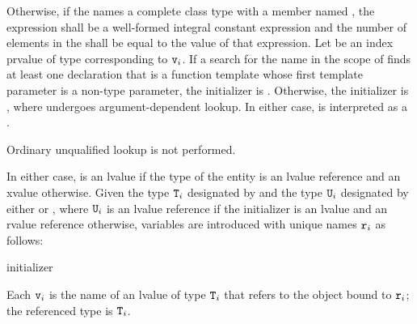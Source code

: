 \pnum
Otherwise, if
the  
names a complete class type with a member named ,
the expression 
shall be a well-formed integral constant expression
and
the number of elements in
the  shall be equal to the value of that
expression.
Let  be an index prvalue of type 
corresponding to $\texttt{v}_i$.
If a search for the name 
in the scope of 
finds at least one declaration
that is a function template whose first template parameter
is a non-type parameter,
the initializer is
. Otherwise, the initializer is ,
where  undergoes argument-dependent lookup.
In either case,  is interpreted as a .
\begin{note}
Ordinary unqualified lookup is not performed.
\end{note}
In either case,  is an lvalue if the type of the entity 
is an lvalue reference and an xvalue otherwise.
Given the type $\texttt{T}_i$ designated by
 and
the type $\texttt{U}_i$ designated by
either  or ,
where $\texttt{U}_i$ is an lvalue reference if
the initializer is an lvalue and an rvalue reference otherwise,
variables are introduced with unique names $\texttt{r}_i$ as follows:

\begin{ncbnf}
  initializer \terminal{;}
\end{ncbnf}

Each $\texttt{v}_i$ is the name of an lvalue of type $\texttt{T}_i$
that refers to the object bound to $\texttt{r}_i$;
the referenced type is $\texttt{T}_i$.

